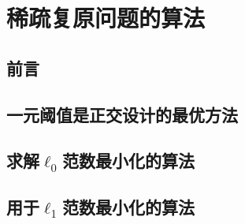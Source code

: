 \chapter{稀疏复原问题的算法}\label{chap:srt03:algorithms}
\section{前言}





\section{一元阈值是正交设计的最优方法}



\section{求解$ \ell_0 $范数最小化的算法}




\section{用于$ \ell_1 $范数最小化的算法}